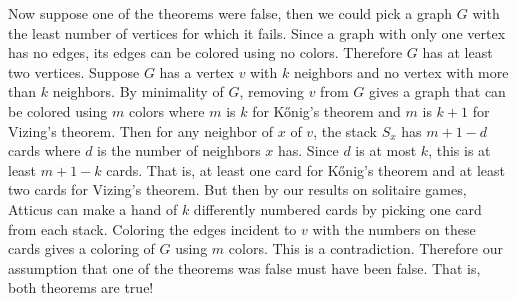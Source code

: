 \documentclass[12pt]{article}
\theoremstyle{plain}
\theoremstyle{definition}
\theoremstyle{remark}
\begin{document}
Now suppose one of the theorems were false, then we could pick a graph $G$ with the least number of vertices for which it fails.  Since a graph with only one vertex has no edges, its edges can be colored using no colors.  Therefore $G$ has at least two vertices.  Suppose $G$ has a vertex $v$ with $k$ neighbors and no vertex with more than $k$ neighbors. By minimality of $G$, removing $v$ from $G$  gives a graph that can be colored using $m$ colors where $m$ is $k$ for K\H{o}nig's theorem and $m$ is $k+1$ for Vizing's theorem.  Then for any neighbor of $x$ of $v$, the stack $S_x$ has $m + 1 - d$ cards where $d$ is the number of neighbors $x$ has.  Since $d$ is at most $k$, this is at least $m + 1 - k$ cards.  That is, at least one card for K\H{o}nig's theorem and at least two cards for Vizing's theorem.  But then by our results on solitaire games, Atticus can make a hand of $k$ differently numbered cards by picking one card from each stack.  Coloring the edges incident to $v$ with the numbers on these cards gives a coloring of $G$ using $m$ colors.  This is a contradiction.  Therefore our assumption that one of the theorems was false must have been false.  That is, both theorems are true!




\end{document}
